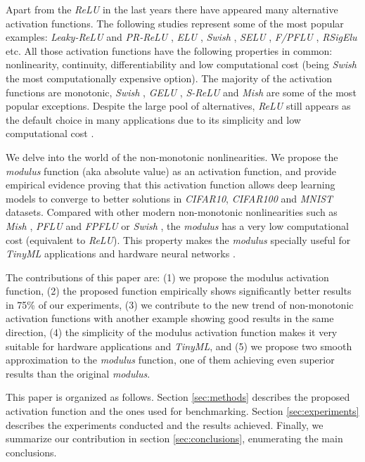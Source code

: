 \documentclass[authoryear]{elsarticle}
\begin{document}
Apart from the \textit{ReLU} in the last years there have appeared many alternative activation functions. The following studies represent some of the most popular examples: \textit{Leaky-ReLU} and \textit{PR-ReLU} \citep{xu2015}, \textit{ELU} \citep{djork2016}, \textit{Swish} \citep{ramachandran2018}, \textit{SELU} \citep{klambauer2017}, \textit{F/PFLU} \citep{zhu2020}, \textit{RSigElu} \cite{Kilicarslan2021} etc. All those activation functions have the following properties in common: nonlinearity, continuity, differentiability and low computational cost (being \textit{Swish} the most computationally expensive option). The majority of the activation functions are monotonic, \textit{Swish} \citep{ramachandran2018}, \textit{GELU} \citep{hendrycks2016},  \textit{S-ReLU} \citep{Jin2016} and \textit{Mish} \citep{misra2019mish} are some of the most popular exceptions. Despite the large pool of alternatives, \textit{ReLU} still appears as the default choice in many applications due to its simplicity and low computational cost \citep{nair2010}.

We delve into the world of the non-monotonic nonlinearities. We propose the \textit{modulus} function (aka absolute value) as an activation function, and provide empirical evidence proving that this activation function allows deep learning models to converge to better solutions in \textit{CIFAR10}, \textit{CIFAR100} and \textit{MNIST} datasets. Compared with other modern non-monotonic nonlinearities such as \textit{Mish} \citep{misra2019mish}, \textit{PFLU} and \textit{FPFLU} \citep{zhu2020} or \textit{Swish}  \citep{ramachandran2018}, the \textit{modulus} has a very low computational cost (equivalent to \textit{ReLU}). This property makes the \textit{modulus} specially useful for \textit{TinyML} applications \citep{sanchez2020} and hardware neural networks \citep{Misra2010}. 

The contributions of this paper are: (1) we propose the modulus activation function, (2) the proposed function empirically shows significantly better results in 75\% of our experiments, (3) we contribute to the new trend of non-monotonic activation functions with another example showing good results in the same direction, (4) the simplicity of the modulus activation function makes it very suitable for hardware applications and \textit{TinyML}, and (5) we propose two smooth approximation to the \textit{modulus} function, one of them achieving even superior results than the original \textit{modulus}.

This paper is organized as follows. Section \ref{sec:methods} describes the proposed activation function and the ones used for benchmarking. Section \ref{sec:experiments} describes the experiments conducted and the results achieved. Finally, we summarize our contribution in section \ref{sec:conclusions}, enumerating the main conclusions.
\end{document}
